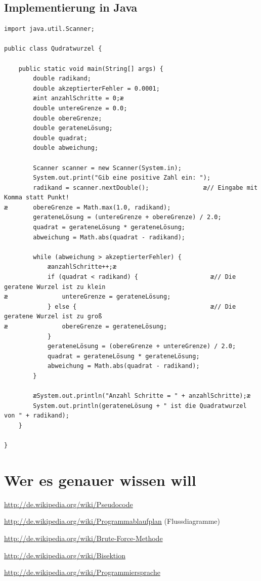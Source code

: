 \clearpage

\subsection{Implementierung in Java}

\begin{lstlisting}
import java.util.Scanner;

public class Qudratwurzel {

	public static void main(String[] args) {
		double radikand;
		double akzeptierterFehler = 0.0001;
		æint anzahlSchritte = 0;æ
		double untereGrenze = 0.0;
		double obereGrenze;
		double gerateneLösung;
		double quadrat;
		double abweichung;

		Scanner scanner = new Scanner(System.in);
		System.out.print("Gib eine positive Zahl ein: ");
		radikand = scanner.nextDouble();               æ// Eingabe mit Komma statt Punkt! 
æ	    obereGrenze = Math.max(1.0, radikand);
		gerateneLösung = (untereGrenze + obereGrenze) / 2.0;
		quadrat = gerateneLösung * gerateneLösung;
		abweichung = Math.abs(quadrat - radikand);

		while (abweichung > akzeptierterFehler) {
			æanzahlSchritte++;æ
			if (quadrat < radikand) {                    æ// Die geratene Wurzel ist zu klein
æ			    untereGrenze = gerateneLösung;
			} else {                                     æ// Die geratene Wurzel ist zu groß
æ			    obereGrenze = gerateneLösung;
			}
			gerateneLösung = (obereGrenze + untereGrenze) / 2.0;
			quadrat = gerateneLösung * gerateneLösung;
			abweichung = Math.abs(quadrat - radikand);
		}

		æSystem.out.println("Anzahl Schritte = " + anzahlSchritte);æ
		System.out.println(gerateneLösung + " ist die Quadratwurzel von " + radikand);
	}

}
\end{lstlisting}


\clearpage

\section{Wer es genauer wissen will}

\url{http://de.wikipedia.org/wiki/Pseudocode}

\url{http://de.wikipedia.org/wiki/Programmablaufplan} (Flussdiagramme)

\url{http://de.wikipedia.org/wiki/Brute-Force-Methode}

\url{http://de.wikipedia.org/wiki/Bisektion}

\url{http://de.wikipedia.org/wiki/Programmiersprache}


